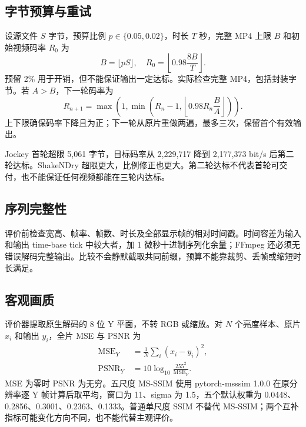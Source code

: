 \documentclass[UTF8,12pt,a4paper,twocolumn]{ctexart}
\begin{document}
\subsection{字节预算与重试}
设源文件 $S$ 字节，预算比例 $p\in\{0.05,0.02\}$，时长 $T$ 秒，完整 MP4 上限 $B$ 和初始视频码率 $R_0$ 为
\begin{equation}B=\lfloor pS\rfloor,\quad R_0=\left\lfloor0.98\frac{8B}{T}\right\rfloor.\end{equation}
预留 2\% 用于开销，但不能保证输出一定达标。实际检查完整 MP4，包括封装字节。若 $A>B$，下一轮码率为
\begin{equation}R_{n+1}=\max\!\left(1,\min\!\left(R_n-1,\left\lfloor0.98R_n\frac BA\right\rfloor\right)\right).\end{equation}
上下限确保码率下降且为正；下一轮从原片重做两遍，最多三次，保留首个有效输出。
\begin{table}[H]\centering\caption{medium/AQ 1 在 2\% 预算下的实际反馈。}\end{table}
Jockey 首轮超限 5,061 字节，目标码率从 2,229,717 降到 2,177,373 bit/s 后第二轮达标。ShakeNDry 超限更大，比例修正也更大。第二轮达标不代表首轮可交付，也不能保证任何视频都能在三轮内达标。
\subsection{序列完整性}
评价前检查宽高、帧率、帧数、时长及全部显示帧的相对时间戳。时间容差为输入和输出 time-base tick 中较大者，加 1 微秒十进制序列化余量；FFmpeg 还必须无错误解码完整输出。比较不会静默截取共同前缀，预算不能靠裁剪、丢帧或缩短时长满足。
\subsection{客观画质}
评价器提取原生解码的 8 位 Y 平面，不转 RGB 或缩放。对 $N$ 个亮度样本、原片 $x_i$ 和输出 $y_i$，全片 MSE 与 PSNR 为
\begin{equation}\begin{aligned}\mathrm{MSE}_Y\,&=\frac1N\sum_i(x_i-y_i)^2,\\\mathrm{PSNR}_Y\,&=10\log_{10}\frac{255^2}{\mathrm{MSE}_Y}.\end{aligned}\end{equation}
MSE 为零时 PSNR 为无穷。五尺度 MS-SSIM 使用 pytorch-msssim 1.0.0 在原分辨率逐 Y 帧计算后取平均，窗口为 11、sigma 为 1.5，五个默认权重为 0.0448、0.2856、0.3001、0.2363、0.1333。普通单尺度 SSIM 不替代 MS-SSIM；两个互补指标可能变化方向不同，也不能代替主观评价。
\end{document}
